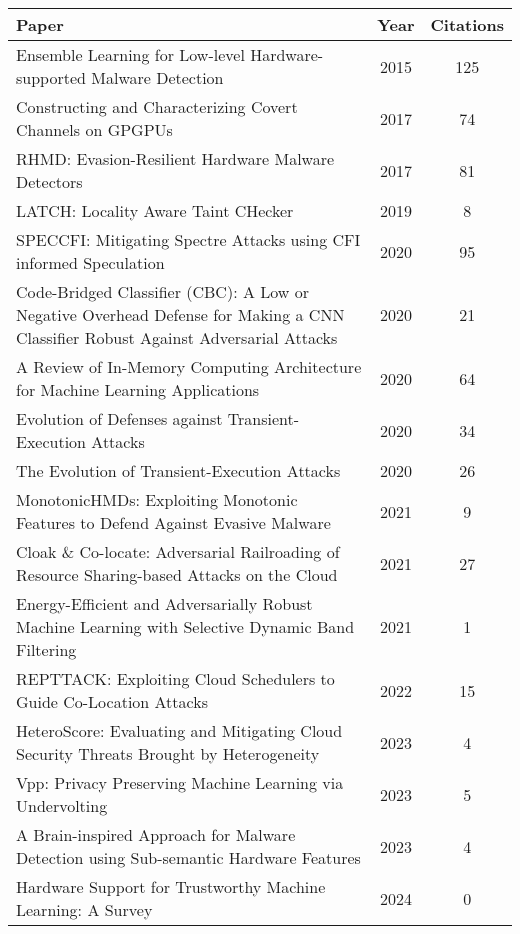 \documentclass{article}
\begin{document}
	\begin{center}
		\begin{tabular}{|p{5cm}| c | c |} 
			\hline
			Paper & Year & Citations \\ [0.5ex] 
			\hline\hline
			Ensemble Learning for Low-level Hardware-supported Malware Detection & 2015 & 125 \\ 
			\hline
			Constructing and Characterizing Covert Channels on GPGPUs & 2017 & 74 \\ 
			\hline
			RHMD: Evasion-Resilient Hardware Malware Detectors & 2017 & 81 \\ 
			\hline
			LATCH: Locality Aware Taint CHecker & 2019 & 8 \\ 
			\hline
			SPECCFI: Mitigating Spectre Attacks using CFI informed Speculation & 2020 & 95 \\ 
			\hline
			Code-Bridged Classifier (CBC): A Low or Negative Overhead Defense for Making a CNN Classifier Robust Against Adversarial Attacks & 2020 & 21 \\ 
			\hline
			A Review of In-Memory Computing Architecture for Machine Learning Applications & 2020 & 64 \\ 
			\hline
			Evolution of Defenses against Transient-Execution Attacks  & 2020 & 34 \\ 
			\hline
			The Evolution of Transient-Execution Attacks    & 2020 & 26 \\
			\hline
			MonotonicHMDs: Exploiting Monotonic Features to Defend Against Evasive Malware    & 2021 & 9 \\
			\hline
			Cloak \& Co-locate: Adversarial Railroading of Resource Sharing-based Attacks on the Cloud & 2021 & 27 \\
			\hline
			Energy-Efficient and Adversarially Robust Machine Learning with Selective Dynamic Band Filtering & 2021 & 1 \\
			\hline
			REPTTACK: Exploiting Cloud Schedulers to Guide Co-Location Attacks & 2022 & 15 \\
			\hline
			HeteroScore: Evaluating and Mitigating Cloud Security Threats Brought by Heterogeneity & 2023 & 4 \\
			\hline
			Vpp: Privacy Preserving Machine Learning via Undervolting  & 2023 & 5 \\
			\hline
			A Brain-inspired Approach for Malware Detection using Sub-semantic Hardware Features & 2023 & 4 \\
			\hline
			Hardware Support for Trustworthy Machine Learning: A Survey & 2024 & 0 \\ [1ex] 
			\hline
		\end{tabular}
	\end{center}
	
\end{document}
